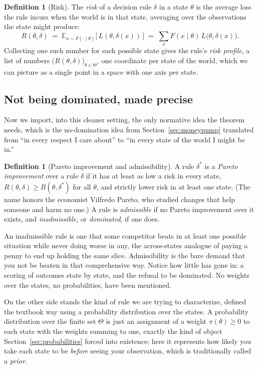 \documentclass[10pt]{article}
\theoremstyle{definition}
\newtheorem{definition}[theorem]{Definition}
\theoremstyle{remark}
\newcommand{\E}{\mathbb{E}}
\begin{document}
\begin{definition}[Risk]
\label{def:risk}
The \emph{risk} of a decision rule $\delta$ in a state $\theta$ is the average loss the rule incurs when the world is in that state, averaging over the observations the state might produce:
\[
R(\theta, \delta) \;=\; \E_{x \sim F(\cdot \mid \theta)}\big[\, L(\theta, \delta(x)) \,\big]
\;=\; \sum_x F(x \mid \theta)\, L\big(\theta, \delta(x)\big).
\]
Collecting one such number for each possible state gives the rule's \emph{risk profile}, a list of numbers $\big(R(\theta, \delta)\big)_{\theta \in \Theta}$, one coordinate per state of the world, which we can picture as a single point in a space with one axis per state.
\end{definition}

\subsection{Not being dominated, made precise}

Now we import, into this cleaner setting, the only normative idea the theorem needs, which is the no-domination idea from Section~\ref{sec:moneypump} translated from ``in every respect I care about'' to ``in every state of the world I might be in.''

\begin{definition}[Pareto improvement and admissibility]
\label{def:admissible}
A rule $\delta^*$ is a \emph{Pareto improvement} over a rule $\delta$ if it has at least as low a risk in every state, $R(\theta, \delta) \ge R(\theta, \delta^*)$ for all $\theta$, and strictly lower risk in at least one state. (The name honors the economist Vilfredo Pareto, who studied changes that help someone and harm no one.) A rule is \emph{admissible} if no Pareto improvement over it exists, and \emph{inadmissible}, or \emph{dominated}, if one does.
\end{definition}

An inadmissible rule is one that some competitor beats in at least one possible situation while never doing worse in any, the across-states analogue of paying a penny to end up holding the same slice. Admissibility is the bare demand that you not be beaten in that comprehensive way. Notice how little has gone in: a scoring of outcomes state by state, and the refusal to be dominated. No weights over the states, no probabilities, have been mentioned.

On the other side stands the kind of rule we are trying to characterize, defined the textbook way using a probability distribution over the states. A probability distribution over the finite set $\Theta$ is just an assignment of a weight $\pi(\theta) \ge 0$ to each state with the weights summing to one, exactly the kind of object Section~\ref{sec:probabilities} forced into existence; here it represents how likely you take each state to be \emph{before} seeing your observation, which is traditionally called a \emph{prior}.
\end{document}
